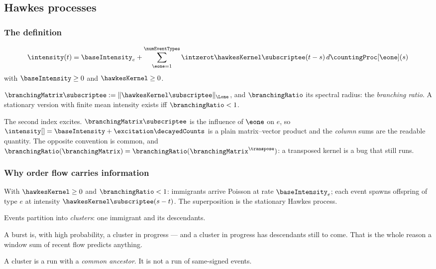 \subsection{Hawkes processes}

\begin{frame}
  \frametitle{The definition}
\begin{equation*}
 \intensity(t) = \baseIntensity_e
 + \sum_{\eone=1}^{\numEventTypes}\intzerot \hawkesKernel\subscriptee(t-s) \, d\countingProc[\eone](s)
\end{equation*}
with $\baseIntensity \geq 0$ and $\hawkesKernel \geq 0$.

\pause

$\branchingMatrix\subscriptee := \Vert \hawkesKernel\subscriptee \Vert_{\Lone}$,
and $\branchingRatio$ its spectral radius: the \emph{branching ratio}.
A stationary version with finite mean intensity exists iff $\branchingRatio<1$.

\pause

\alert{The second index excites.}
$\branchingMatrix\subscriptee$ is the influence of $\eone$ on $e$,
so $\intensity[ ] = \baseIntensity + \excitation\decayedCounts$ is a plain matrix--vector
product and the \emph{column} sums are the readable quantity.
The opposite convention is common, and
$\branchingRatio(\branchingMatrix) = \branchingRatio(\branchingMatrix^{\transpose})$:
a transposed kernel is a bug that still runs.
\end{frame}

\begin{frame}
  \frametitle{Why order flow carries information}
\begin{prop}
 With $\hawkesKernel \geq 0$ and $\branchingRatio<1$:
 immigrants arrive Poisson at rate $\baseIntensity_e$;
 each event spawns offspring of type $e$ at intensity $\hawkesKernel\subscriptee(s-t)$.
 The superposition is the stationary Hawkes process.
\end{prop}

\pause

Events partition into \emph{clusters}: one immigrant and its descendants.

\pause

A burst is, with high probability, a cluster in progress ---
and a cluster in progress has descendants still to come.
That is the whole reason a window sum of recent flow predicts anything.

\pause

A cluster is a run with a \emph{common ancestor}.
It is not a run of same-signed events.
\end{frame}

